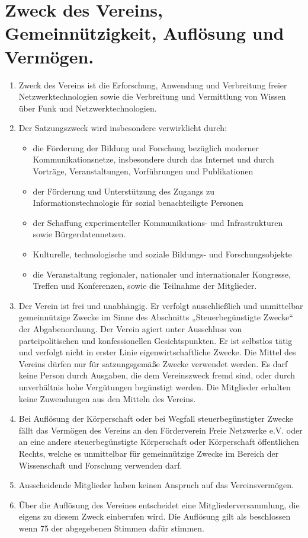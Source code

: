 \documentclass[12pt,a4paper,titlepage]{scrartcl}
\begin{document}
\section{Zweck des Vereins, Gemeinnützigkeit, Auflösung und Vermögen.}
\begin{enumerate}
\item Zweck des Vereins ist die Erforschung, Anwendung und Verbreitung freier 
Netzwerktechnologien sowie die Verbreitung und Vermittlung von Wissen über Funk und 
Netzwerktechnologien. 
\item Der Satzungszweck wird insbesondere verwirklicht durch:
\begin{itemize}
\item die Förderung der Bildung und Forschung bezüglich moderner Kommunikationsnetze, insbesondere durch das Internet und durch Vorträge, Veranstaltungen, Vorführungen und Publikationen
\item der Förderung und Unterstützung des Zugangs zu Informationstechnologie für sozial benachteiligte Personen 
\item  der Schaffung experimenteller Kommunikations- und Infrastrukturen sowie 
Bürgerdatennetzen. 
\item Kulturelle, technologische und soziale Bildungs- und Forschungsobjekte 
\item die Veranstaltung regionaler, nationaler und internationaler Kongresse, Treffen 
und Konferenzen, sowie die Teilnahme der Mitglieder. 
\end{itemize}
\item Der Verein ist frei und unabhängig. Er verfolgt ausschließlich und unmittelbar 
gemeinnützige Zwecke im Sinne des Abschnitts „Steuerbegünstigte Zwecke“ der 
Abgabenordnung. Der Verein agiert unter Ausschluss von parteipolitischen und konfessionellen Gesichtspunkten. Er ist selbstlos tätig und verfolgt nicht in erster Linie eigenwirtschaftliche Zwecke. Die Mittel des Vereins dürfen nur für satzungsgemäße 
Zwecke verwendet werden. Es darf keine Person durch Ausgaben, die dem 
Vereinszweck fremd sind, oder durch unverhältnis hohe Vergütungen begünstigt 
werden. Die Mitglieder erhalten keine Zuwendungen aus den Mitteln des Vereins. 
\item Bei Auflösung der Körperschaft oder bei Wegfall steuerbegünstigter Zwecke fällt das 
Vermögen des Vereins an den Förderverein Freie Netzwerke e.V. oder an eine andere steuerbegünstigte 
Körperschaft oder Körperschaft öffentlichen Rechts, welche es unmittelbar für 
gemeinnützige Zwecke im Bereich der Wissenschaft und Forschung verwenden darf. 
\item Ausscheidende Mitglieder haben keinen Anspruch auf das Vereinsvermögen. 
\item Über die Auflösung des Vereines entscheidet eine Mitgliederversammlung, die eigens 
zu diesem Zweck einberufen wird. Die Auflösung gilt als beschlossen wenn 75%
der abgegebenen Stimmen dafür stimmen.
\end{enumerate}
\end{document}
